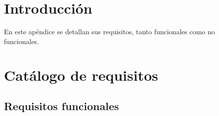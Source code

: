 \label{sec:appendixB}

\section{Introducción}

En este apéndice se detallan sus requisitos, tanto funcionales como no funcionales.

\section{Catálogo de requisitos}
\subsection{Requisitos funcionales}

